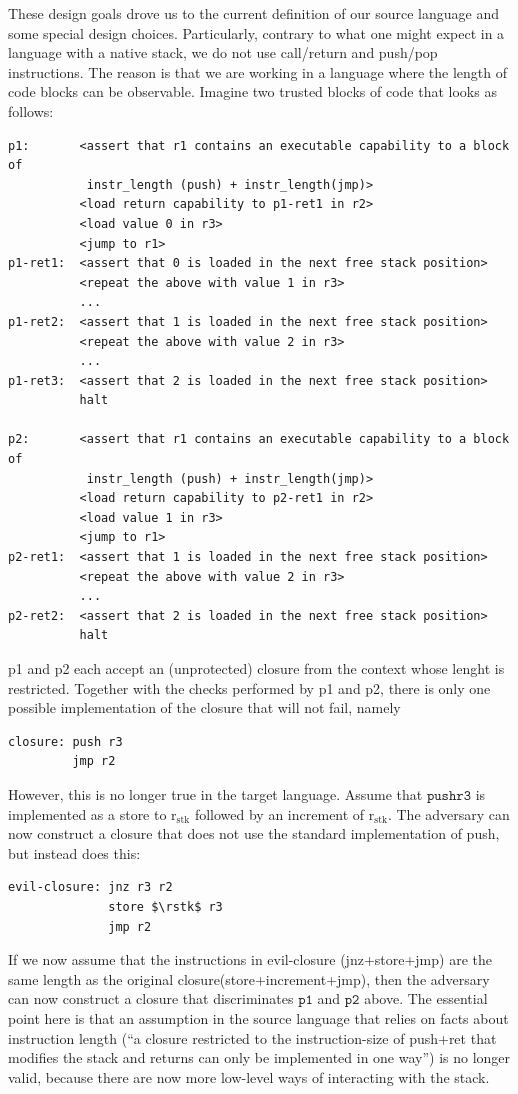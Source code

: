 \documentclass[a4paper]{article}
\newcommand{\sourcecolor}{\color{blue}}
\newcommand{\targetcolor}[1]{\color{black}}
\newcommand{\rstk}{\mathrm{r}_\mathrm{stk}}
\begin{document}
These design goals drove us to the current definition of our source language and some special design choices.
Particularly, contrary to what one might expect in a language with a native stack, we do not use call/return and push/pop instructions.
The reason is that we are working in a language where the length of code blocks can be observable.
Imagine two trusted blocks of code that looks as follows:
\begin{lstlisting}[basicstyle=\sourcecolor{}\ttfamily] 
p1:       <assert that r1 contains an executable capability to a block of 
           instr_length (push) + instr_length(jmp)>
          <load return capability to p1-ret1 in r2>
          <load value 0 in r3>
          <jump to r1>
p1-ret1:  <assert that 0 is loaded in the next free stack position>
          <repeat the above with value 1 in r3>
          ...
p1-ret2:  <assert that 1 is loaded in the next free stack position>
          <repeat the above with value 2 in r3>
          ...
p1-ret3:  <assert that 2 is loaded in the next free stack position>
          halt

p2:       <assert that r1 contains an executable capability to a block of 
           instr_length (push) + instr_length(jmp)>
          <load return capability to p2-ret1 in r2>
          <load value 1 in r3>
          <jump to r1>
p2-ret1:  <assert that 1 is loaded in the next free stack position>
          <repeat the above with value 2 in r3>
          ...
p2-ret2:  <assert that 2 is loaded in the next free stack position>
          halt
\end{lstlisting}

p1 and p2 each accept an (unprotected) closure from the context whose lenght is restricted.
Together with the checks performed by p1 and p2, there is only one possible implementation of the closure that will not fail, namely
\begin{lstlisting}[basicstyle=\sourcecolor{}\ttfamily] 
closure: push r3
         jmp r2
\end{lstlisting}

However, this is no longer true in the target language.
Assume that $\mathtt{push r3}$ is implemented as a store to $\rstk$ followed by an increment of $\rstk$.
The adversary can now construct a closure that does not use the standard implementation of push, but instead does this:
\begin{lstlisting}[basicstyle=\targetcolor{}\ttfamily] 
evil-closure: jnz r3 r2
              store $\rstk$ r3
              jmp r2
\end{lstlisting}
If we now assume that the instructions in evil-closure (jnz+store+jmp) are the same length as the original closure(store+increment+jmp), then the adversary can now construct a closure that discriminates $\mathtt{p1}$ and $\mathtt{p2}$ above.
The essential point here is that an assumption in the source language that relies on facts about instruction length (``a closure restricted to the instruction-size of push+ret that modifies the stack and returns can only be implemented in one way'') is no longer valid, because there are now more low-level ways of interacting with the stack.
\end{document}
